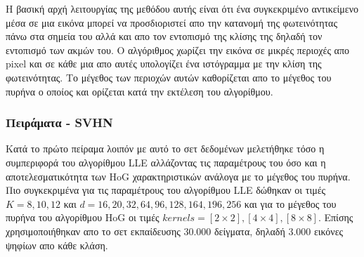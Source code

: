 \par
Η βασική αρχή λειτουργίας της μεθόδου αυτής είναι ότι ένα συγκεκριμένο αντικείμενο μέσα σε μια εικόνα μπορεί να προσδιοριστεί απο την κατανομή της φωτεινότητας πάνω στα σημεία του αλλά και απο τον εντοπισμό της κλίσης της δηλαδή τον εντοπισμό των ακμών του. Ο αλγόριθμος χωρίζει την εικόνα σε μικρές περιοχές απο \textlatin{pixel} και σε κάθε μια απο αυτές υπολογίζει ένα ιστόγραμμα με την κλίση της φωτεινότητας. Το μέγεθος των περιοχών αυτών καθορίζεται απο το μέγεθος του πυρήνα ο οποίος και ορίζεται κατά την εκτέλεση του αλγορίθμου.

\subsubsection{Πειράματα - \textlatin{SVHN}}
\par
Κατά το πρώτο πείραμα λοιπόν με αυτό το σετ δεδομένων μελετήθηκε τόσο η συμπεριφορά του αλγορίθμου \textlatin{LLE} αλλάζοντας τις παραμέτρους του όσο και η αποτελεσματικότητα των \textlatin{HoG} χαρακτηριστικών ανάλογα με το μέγεθος του πυρήνα. Πιο συγκεκριμένα για τις παραμέτρους του αλγορίθμου \textlatin{LLE} δώθηκαν οι τιμές $Κ=8,10,12$ και $d=16,20,32,64,96,128,164,196,256$ και για το μέγεθος του πυρήνα του αλγορίθμου \textlatin{HoG} οι τιμές $kernels=[2\times2],[4\times4],[8\times8]$. Επίσης χρησιμοποιήθηκαν απο το σετ εκπαίδευσης 30.000 δείγματα, δηλαδή 3.000 εικόνες ψηφίων απο κάθε κλάση.

